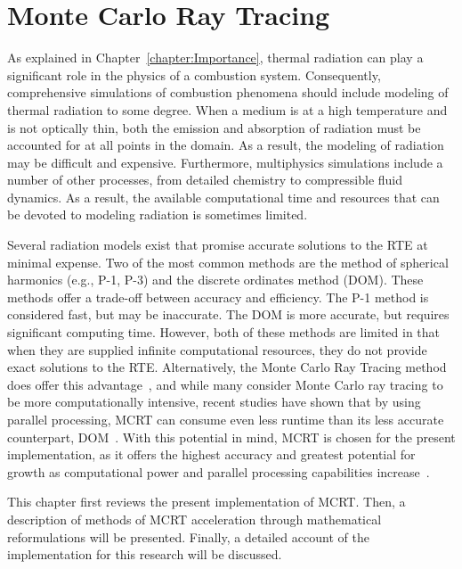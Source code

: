 \addchapheadtotoc
\chapter{Monte Carlo Ray Tracing}\label{chapter:Modeling}
As explained in Chapter~\ref{chapter:Importance}, thermal radiation can play a significant role in the physics of a combustion system. Consequently, comprehensive simulations of combustion phenomena should include modeling of thermal radiation to some degree. 
When a medium is at a high temperature and is not optically thin, both the emission and absorption of radiation must be accounted for at all points in the domain. As a result, the modeling of radiation may be difficult and expensive.
Furthermore, multiphysics simulations include a number of other processes, from detailed chemistry to compressible fluid dynamics. As a result, the available computational time and resources that can be devoted to modeling radiation is sometimes limited.

Several radiation models exist that promise accurate solutions to the RTE at minimal expense. Two of the most common methods are the method of spherical harmonics (e.g., P-1, P-3) and the discrete ordinates method (DOM).
These methods offer a trade-off between accuracy and efficiency. The P-1 method is considered fast, but may be inaccurate. The DOM is more accurate, but requires significant computing time. 
However, both of these methods are limited in that when they are supplied infinite computational resources, they do not provide exact solutions to the RTE. Alternatively, the Monte Carlo Ray Tracing method does offer this advantage~\cite{Leccese2018ConvectiveChambers}, and while many consider Monte Carlo ray tracing to be more computationally intensive, recent studies have shown that by using parallel processing, MCRT can consume even less runtime than its less accurate counterpart, DOM~\cite{Humphrey2016RadiativeRefinement}.
With this potential in mind, MCRT is chosen for the present implementation, as it offers the highest accuracy and greatest potential for growth as computational power and parallel processing capabilities increase~\cite{Liu2020TheFlames,Howell2010ThermalTransfer}.

This chapter first reviews the present implementation of MCRT.
Then, a description of methods of MCRT acceleration through mathematical reformulations will be presented.
Finally, a detailed account of the implementation for this research will be discussed.

